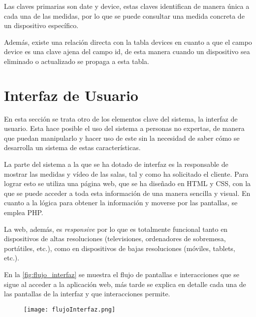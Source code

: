 Las claves primarias son date y device, estas claves identifican de manera única a cada una de las medidas, por lo que se puede consultar una medida concreta de un dispositivo específico.

Además, existe una relación directa con la tabla devices en cuanto a que el campo device es una clave ajena del campo id, de esta manera cuando un dispositivo sea eliminado o actualizado se propaga a esta tabla.

\section{Interfaz de Usuario}\label{sec:interfaz}
En esta sección se trata otro de los elementos clave del sistema, la interfaz de usuario. Esta hace posible el uso del sistema a personas no expertas, de manera que puedan manipularlo y hacer uso de este sin la necesidad de saber cómo se desarrolla un sistema de estas características.

La parte del sistema a la que se ha dotado de interfaz es la responsable de mostrar las medidas y vídeo de las salas, tal y como ha solicitado el cliente. Para lograr esto se utiliza una página web, que se ha diseñado en HTML y CSS, con la que se puede acceder a toda esta información de una manera sencilla y visual. En cuanto a la lógica para obtener la información y moverse por las pantallas, se emplea PHP\@.

La web, además, es \textit{responsive} por lo que es totalmente funcional tanto en dispositivos de altas resoluciones (televisiones, ordenadores de sobremesa, portátiles, etc.), como en dispositivos de bajas resoluciones (móviles, tablets, etc.).

En la \autoref{fig:flujo_interfaz} se muestra el flujo de pantallas e interacciones que se sigue al acceder a la aplicación web, más tarde se explica en detalle cada una de las pantallas de la interfaz y que interacciones permite.
\begin{figure}[H]
	{\texttt{[image: flujoInterfaz.png]}}
\end{figure}

